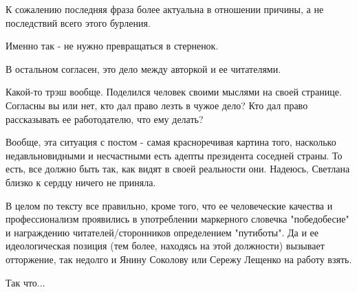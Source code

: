 \begin{itemize}
\begin{itemize}
\end{itemize}

 

К сожалению последняя фраза более актуальна в отношении причины, а не
последствий всего этого бурления.

Именно так - не нужно превращаться в стерненок.

В остальном согласен, это дело между авторкой и ее читателями.


 

Какой-то трэш вообще. Поделился человек своими мыслями на своей странице.
Согласны вы или нет, кто дал право лезть в чужое дело? Кто дал право
рассказывать ее работодателю, что ему делать?

Вообще, эта ситуация с постом - самая красноречивая картина того, насколько
недавльновидными и несчастными есть адепты президента соседней страны. То есть,
все должно быть так, как видят в своей реальности они. Надеюсь, Светлана близко
к сердцу ничего не приняла.

 

В целом по тексту все правильно, кроме того, что ее человеческие качества и
профессионализм проявились в употреблении маркерного словечка "победобесие" и
награждению читателей/сторонников определением "путиботы". Да и ее
идеологическая позиция (тем более, находясь на этой должности) вызывает
отторжение, так недолго и Янину Соколову или Сережу Лещенко на работу взять.

Так что...


 


\end{itemize}
